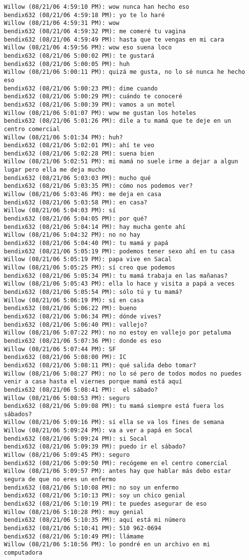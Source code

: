 \begin{verbatim}
Willow (08/21/06 4:59:10 PM): wow nunca han hecho eso
bendix632 (08/21/06 4:59:18 PM): yo te lo haré
Willow (08/21/06 4:59:31 PM): wow
bendix632 (08/21/06 4:59:32 PM): me comeré tu vagina
bendix632 (08/21/06 4:59:49 PM): hasta que te vengas en mi cara
Willow (08/21/06 4:59:56 PM): wow eso suena loco
bendix632 (08/21/06 5:00:02 PM): te gustará
bendix632 (08/21/06 5:00:05 PM): huh
Willow (08/21/06 5:00:11 PM): quizá me gusta, no lo sé nunca he hecho eso
bendix632 (08/21/06 5:00:23 PM): dime cuando
bendix632 (08/21/06 5:00:29 PM): cuándo te conoceré
bendix632 (08/21/06 5:00:39 PM): vamos a un motel
Willow (08/21/06 5:01:07 PM): wow me gustan los hoteles
bendix632 (08/21/06 5:01:26 PM): dile a tu mamá que te deje en un centro comercial
Willow (08/21/06 5:01:34 PM): huh?
bendix632 (08/21/06 5:02:01 PM): ahí te veo
bendix632 (08/21/06 5:02:28 PM): suena bien
Willow (08/21/06 5:02:51 PM): mi mamá no suele irme a dejar a algun lugar pero ella me deja mucho
bendix632 (08/21/06 5:03:03 PM): mucho qué
bendix632 (08/21/06 5:03:35 PM): cómo nos podemos ver?
Willow (08/21/06 5:03:46 PM): me deja en casa
bendix632 (08/21/06 5:03:58 PM): en casa?
Willow (08/21/06 5:04:03 PM): sí
bendix632 (08/21/06 5:04:05 PM): por qué?
bendix632 (08/21/06 5:04:14 PM): hay mucha gente ahí
Willow (08/21/06 5:04:32 PM): no no hay
bendix632 (08/21/06 5:04:40 PM): tu mamá y papá
bendix632 (08/21/06 5:05:19 PM): podemos tener sexo ahí en tu casa
Willow (08/21/06 5:05:19 PM): papa vive en Sacal
Willow (08/21/06 5:05:25 PM): sí creo que podemos
bendix632 (08/21/06 5:05:34 PM): tu mamá trabaja en las mañanas?
Willow (08/21/06 5:05:43 PM): ella lo hace y visita a papá a veces
bendix632 (08/21/06 5:05:54 PM): sólo tú y tu mamá?
Willow (08/21/06 5:06:19 PM): sí en casa
bendix632 (08/21/06 5:06:22 PM): bueno
bendix632 (08/21/06 5:06:34 PM): dónde vives?
bendix632 (08/21/06 5:06:40 PM): vallejo?
Willow (08/21/06 5:07:22 PM): no no estoy en vallejo por petaluma
bendix632 (08/21/06 5:07:36 PM): donde es eso
Willow (08/21/06 5:07:44 PM): SF
bendix632 (08/21/06 5:08:00 PM): IC
bendix632 (08/21/06 5:08:11 PM): qué salida debo tomar?
Willow (08/21/06 5:08:27 PM): no lo sé pero de todos modos no puedes venir a casa hasta el viernes porque mamá está aquí
bendix632 (08/21/06 5:08:41 PM):  el sábado?
Willow (08/21/06 5:08:53 PM): seguro
bendix632 (08/21/06 5:09:08 PM): tu mamá siempre está fuera los sábados?
Willow (08/21/06 5:09:16 PM): sí ella se va los fines de semana
Willow (08/21/06 5:09:24 PM): va a ver a papá en Socal
bendix632 (08/21/06 5:09:24 PM): si Socal
bendix632 (08/21/06 5:09:39 PM): puedo ir el sábado?
Willow (08/21/06 5:09:45 PM): seguro
bendix632 (08/21/06 5:09:50 PM): recógeme en el centro comercial
Willow (08/21/06 5:09:57 PM): antes hay que hablar más debo estar segura de que no eres un enfermo
bendix632 (08/21/06 5:10:08 PM): no soy un enfermo
bendix632 (08/21/06 5:10:13 PM): soy un chico genial
bendix632 (08/21/06 5:10:19 PM): te puedes asegurar de eso
Willow (08/21/06 5:10:28 PM): muy genial
bendix632 (08/21/06 5:10:35 PM): aquí está mi número
bendix632 (08/21/06 5:10:41 PM): 510 962-0694
bendix632 (08/21/06 5:10:49 PM): llámame
Willow (08/21/06 5:10:56 PM): lo pondré en un archivo en mi computadora
\end{verbatim}
